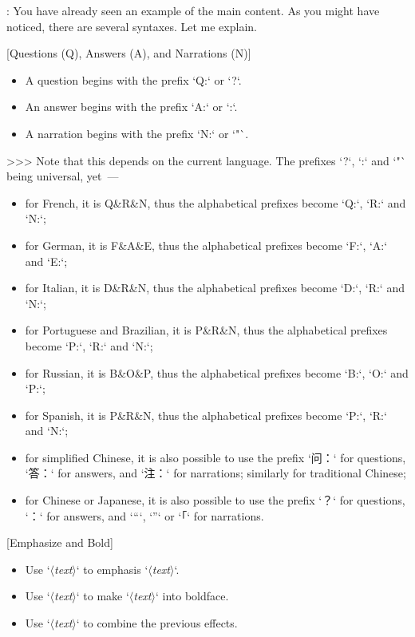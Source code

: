\documentclass[%
  use style = classical,
  scroll,
]{Q-and-A}
\newcommand{\meta}[1]{$\langle${\normalfont\itshape#1}$\rangle$}
\begin{document}
:
  You have already seen an example of the main content. As you might have noticed, there are several syntaxes. Let me explain.

  [Questions (Q), Answers (A), and Narrations (N)]
  \begin{itemize}
    \item A question begins with the prefix `Q:` or `?`.
    \item An answer begins with the prefix `A:` or `:`.
    \item A narration begins with the prefix `N:` or `"`.
  \end{itemize}
  >>> Note that this depends on the current language. The prefixes `?`, `:` and `"` being universal, yet~—
  \begin{itemize}
    \item for French, it is Q\&R\&N, thus the alphabetical prefixes become `Q:`, `R:` and `N:`;
    \item for German, it is F\&A\&E, thus the alphabetical prefixes become `F:`, `A:` and `E:`;
    \item for Italian, it is D\&R\&N, thus the alphabetical prefixes become `D:`, `R:` and `N:`;
    \item for Portuguese and Brazilian, it is P\&R\&N, thus the alphabetical prefixes become `P:`, `R:` and `N:`;
    \item for Russian, it is B\&O\&P, thus the alphabetical prefixes become `B:`, `O:` and `P:`;
    \item for Spanish, it is P\&R\&N, thus the alphabetical prefixes become `P:`, `R:` and `N:`;
    \item for simplified Chinese, it is also possible to use the prefix `问：` for questions, `答：` for answers, and `注：` for narrations; similarly for traditional Chinese;
    \item for Chinese or Japanese, it is also possible to use the prefix `？` for questions, `：` for answers, and `“`, `”` or `「` for narrations.
  \end{itemize}

  [Emphasize and Bold]
  \begin{itemize}
    \item Use `\textasterisk\meta{text}\textasterisk` to emphasis `\meta{text}`.
    \item Use `\textasterisk\textasterisk\meta{text}\textasterisk\textasterisk` to make `\meta{text}` into boldface.
    \item Use `\textasterisk\textasterisk\textasterisk\meta{text}\textasterisk\textasterisk\textasterisk` to combine the previous effects.
  \end{itemize}
\end{document}
